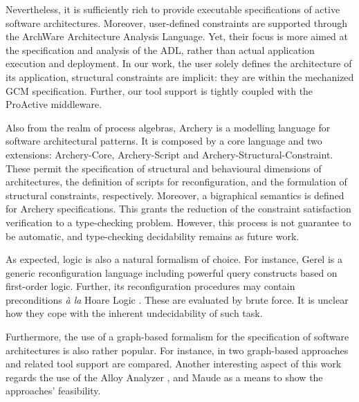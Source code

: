 	Nevertheless, it is sufficiently rich to provide executable specifications of active software
	architectures. Moreover, user-defined constraints are supported through the ArchWare 
	Architecture Analysis Language. Yet, their focus is more aimed at the specification
	and analysis of the \ac{ADL}, rather than actual application execution and deployment.
	In our work, the user solely defines the architecture of its application, structural constraints
	are implicit: they are within the mechanized \ac{GCM} specification.	Further, our tool support
	is tightly coupled with the ProActive middleware.
	
		
		Also from the realm of process algebras, Archery \cite{conf/facs2/SanchezBR11} is a modelling
	language for software architectural patterns. It is composed by a core language and two extensions:
	\textsf{Archery-Core}, \textsf{Archery-Script} and \textsf{Archery-Structural-Constraint}.
	These permit the specification of structural and behavioural dimensions of architectures,
	the definition of scripts for  reconfiguration, and the formulation of structural constraints,
	respectively. Moreover, a bigraphical semantics is defined for Archery specifications. This grants
	the reduction of the constraint satisfaction verification to a type-checking problem. However,
	this process is not guarantee to be automatic, and type-checking decidability remains as future work.
	
	
				
		
	As expected, logic is also a natural formalism of choice. For instance, Gerel \cite{endler1992}
	is a generic reconfiguration language including powerful query constructs based on first-order logic.
	Further, its reconfiguration procedures may contain preconditions \textit{\`a la} 
	Hoare Logic \cite{Hoare69anaxiomatic}. These are evaluated by brute force. It is unclear
	how they cope with the inherent undecidability of such task. 


	Furthermore, the use of a graph-based formalism for the specification of software architectures
	is also rather popular. For instance, in \cite{Bruni:2008:GDA:1424922.1424928} two graph-based
	approaches and related tool support are compared. Another interesting aspect of this work
	regards the use of the Alloy Analyzer \cite{Jackson:2002:ALO:505145.505149}, 
	and Maude \cite{Clavel:2002:MSP:633559.633563} as a means to show the approaches' feasibility. 
		

